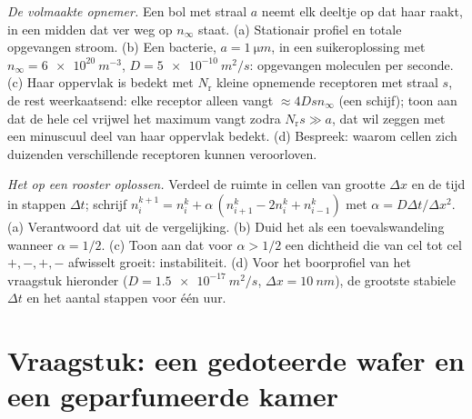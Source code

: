 \begin{exercise}[$\star\star\star$]\label{exo:b2:particle-diffusion:11}
\emph{De volmaakte opnemer.} Een bol met straal $a$ neemt elk
deeltje op dat haar raakt, in een midden dat ver weg op $n_\infty$ staat. (a)
Stationair profiel en totale opgevangen stroom. (b) Een bacterie,
$a =
\qty{1}{\micro m}$, in een suikeroplossing met
$n_\infty = \qty{6e20}{m^{-3}}$,
$D = \qty{5e-10}{m^2/s}$: opgevangen moleculen per seconde. (c) Haar
oppervlak is bedekt met $N_{\text{r}}$ kleine opnemende receptoren met
straal $s$, de rest weerkaatsend: elke receptor alleen vangt
$\approx
4Ds n_\infty$ (een schijf); toon aan dat de hele cel vrijwel
het maximum vangt zodra $N_{\text{r}} s \gg a$, dat wil zeggen met een
minuscuul deel van haar
oppervlak bedekt. (d) Bespreek: waarom cellen zich duizenden
verschillende receptoren kunnen veroorloven.
\end{exercise}

\begin{exercise}[$\star\star\star$]\label{exo:b2:particle-diffusion:12}
\emph{Het op een rooster oplossen.} Verdeel de ruimte in cellen van grootte
$\Delta x$
en de tijd in stappen $\Delta t$; schrijf
$n_i^{k+1} = n_i^k + \alpha\,(n_{i+1}^k
- 2n_i^k + n_{i-1}^k)$ met
$\alpha = D\Delta t/\Delta x^2$. (a) Verantwoord dat
uit de vergelijking. (b) Duid het als een toevalswandeling wanneer
$\alpha =
1/2$. (c) Toon aan dat voor $\alpha > 1/2$ een dichtheid die van
cel tot cel
$+,-,+,-$ afwisselt groeit: instabiliteit. (d) Voor het boorprofiel van het
vraagstuk hieronder ($D = \qty{1.5e-17}{m^2/s}$, $\Delta x = \qty{10}{nm}$),
de grootste stabiele $\Delta t$ en het aantal stappen voor één uur.
\end{exercise}

\section{Vraagstuk: een gedoteerde wafer en een geparfumeerde kamer}

